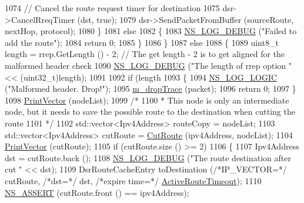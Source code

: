 \begin{DoxyCode}
1074           \textcolor{comment}{// Cancel the route request timer for destination}
1075           dsr->CancelRreqTimer (dst, \textcolor{keyword}{true});
1079           dsr->SendPacketFromBuffer (sourceRoute, nextHop, protocol);
1080         \}
1081       \textcolor{keywordflow}{else}
1082         \{
1083           \hyperlink{group__logging_ga413f1886406d49f59a6a0a89b77b4d0a}{NS\_LOG\_DEBUG} (\textcolor{stringliteral}{"Failed to add the route"});
1084           \textcolor{keywordflow}{return} 0;
1085         \}
1086     \}
1087   \textcolor{keywordflow}{else}
1088     \{
1089       uint8\_t length = rrep.GetLength () - 2; \textcolor{comment}{// The get length - 2 is to get aligned for the malformed
       header check}
1090       \hyperlink{group__logging_ga413f1886406d49f59a6a0a89b77b4d0a}{NS\_LOG\_DEBUG} (\textcolor{stringliteral}{"The length of rrep option "} << (uint32\_t)length);
1091 
1092       \textcolor{keywordflow}{if} (length %
1093         \{
1094           \hyperlink{group__logging_ga88acd260151caf2db9c0fc84997f45ce}{NS\_LOG\_LOGIC} (\textcolor{stringliteral}{"Malformed header. Drop!"});
1095           \hyperlink{classns3_1_1dsr_1_1DsrOptions_a176bbc9efb58b6d750c14b9b03c525c4}{m\_dropTrace} (packet);
1096           \textcolor{keywordflow}{return} 0;
1097         \}
1098       \hyperlink{classns3_1_1dsr_1_1DsrOptions_a44ae8e58769880ec9c0150bb28652350}{PrintVector} (nodeList);
1099       \textcolor{comment}{/*}
1100 \textcolor{comment}{       * This node is only an intermediate node, but it needs to save the possible route to the destination
       when cutting the route}
1101 \textcolor{comment}{       */}
1102       std::vector<Ipv4Address> routeCopy = nodeList;
1103       std::vector<Ipv4Address> cutRoute = \hyperlink{classns3_1_1dsr_1_1DsrOptions_a8bea995195bd88aab4610af594f099d0}{CutRoute} (ipv4Address, nodeList);
1104       \hyperlink{classns3_1_1dsr_1_1DsrOptions_a44ae8e58769880ec9c0150bb28652350}{PrintVector} (cutRoute);
1105       \textcolor{keywordflow}{if} (cutRoute.size () >= 2)
1106         \{
1107           Ipv4Address dst = cutRoute.back ();
1108           \hyperlink{group__logging_ga413f1886406d49f59a6a0a89b77b4d0a}{NS\_LOG\_DEBUG} (\textcolor{stringliteral}{"The route destination after cut "} << dst);
1109           DsrRouteCacheEntry toDestination (\textcolor{comment}{/*IP\_VECTOR=*/} cutRoute, \textcolor{comment}{/*dst=*/} dst, \textcolor{comment}{/*expire time=*/} 
      \hyperlink{classns3_1_1dsr_1_1DsrOptions_a2d111e83b3c91f18ea49478a35ebb119}{ActiveRouteTimeout});
1110           \hyperlink{assert_8h_a6dccdb0de9b252f60088ce281c49d052}{NS\_ASSERT} (cutRoute.front () == ipv4Address);

\end{DoxyCode}
